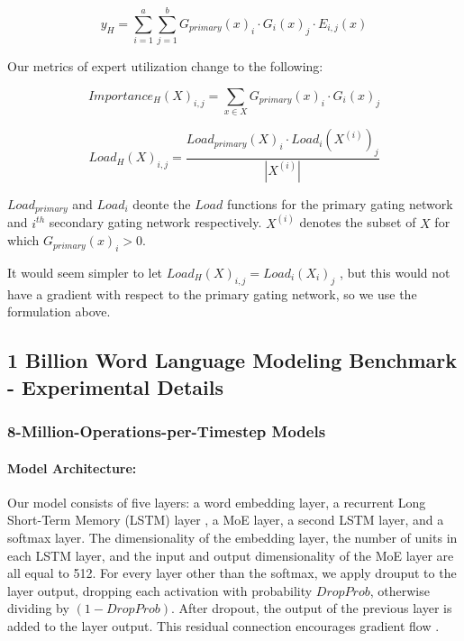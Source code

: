 \documentclass{article}
\begin{document}
\begin{equation}\label{eq:gate_expert}
y_H = \sum_{i=1}^{a}\sum_{j=1}^{b}G_{primary}(x)_i \cdot G_i(x)_j \cdot E_{i,j}(x)
\end{equation}

Our metrics of expert utilization change to the following:

\begin{equation}
Importance_H(X)_{i,j} = \sum_{x \in X}G_{primary}(x)_i \cdot G_i(x)_j
\end{equation}

\begin{equation}
Load_H(X)_{i,j} = \frac{Load_{primary}(X)_i \cdot Load_i(X^{(i)})_j}{|X^{(i)}|}
\end{equation}

$Load_{primary}$ and $Load_i$ deonte the $Load$ functions for the primary gating network and $i^{th}$ secondary gating network respectively.  $X^{(i)}$ denotes the subset of $X$ for which $G_{primary}(x)_i > 0$.  

It would seem simpler to let $Load_H(X)_{i,j} = Load_i(X_i)_j$ , but this would not have a gradient with respect to the primary gating network, so we use the formulation above.

\subsection{1 Billion Word Language Modeling Benchmark - Experimental Details}\label{sec:appendixlm1b}

\subsubsection{8-Million-Operations-per-Timestep Models}

\paragraph{Model Architecture:}  Our model consists of five layers: a word embedding layer, a recurrent Long Short-Term Memory (LSTM) layer \citep{Hochreiter:1997:LSM,Gers:2000:LFC}, a MoE layer, a second LSTM layer, and a softmax layer.  The dimensionality of the embedding layer, the number of units in each LSTM layer, and the input and output dimensionality of the MoE layer are all equal to 512.  For every layer other than the softmax, we apply drouput \citep{ZarembaSV14} to the layer output, dropping each activation with probability $DropProb$, otherwise dividing by $(1-DropProb)$.  After dropout, the output of the previous layer is added to the layer output. This residual connection encourages gradient flow \citep{HeZRS:2015:DRL}.
\end{document}
